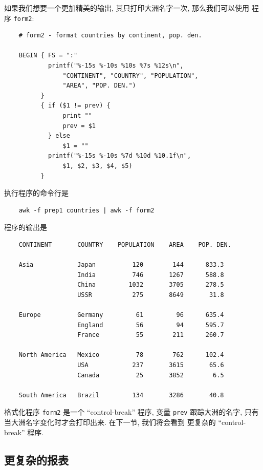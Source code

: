 如果我们想要一个更加精美的输出, 其只打印大洲名字一次, 那么我们可以使用
程序 \verb'form2':
\begin{verbatim}
    # form2 - format countries by continent, pop. den.

    BEGIN { FS = ":"
            printf("%-15s %-10s %10s %7s %12s\n",
                "CONTINENT", "COUNTRY", "POPULATION",
                "AREA", "POP. DEN.")
          }
          { if ($1 != prev) {
                print ""
                prev = $1
            } else
                $1 = ""
            printf("%-15s %-10s %7d %10d %10.1f\n",
                $1, $2, $3, $4, $5)
          }
\end{verbatim}
执行程序的命令行是 
\begin{verbatim}
    awk -f prep1 countries | awk -f form2
\end{verbatim}
程序的输出是
\begin{verbatim}
    CONTINENT       COUNTRY    POPULATION    AREA    POP. DEN.

    Asia            Japan          120        144      833.3
                    India          746       1267      588.8
                    China         1032       3705      278.5
                    USSR           275       8649       31.8

    Europe          Germany         61         96      635.4
                    England         56         94      595.7
                    France          55        211      260.7

    North America   Mexico          78        762      102.4
                    USA            237       3615       65.6
                    Canada          25       3852        6.5

    South America   Brazil         134       3286       40.8
\end{verbatim}

格式化程序 \verb'form2' 是一个 ``control-break'' 程序, 变量 \verb'prev' 
跟踪大洲的名字, 只有当大洲名字变化时才会打印出来. 在下一节, 我们将会看到 
更复杂的 ``control-break'' 程序.

\subsection{更复杂的报表}
\label{subsec:a_more_complex_report}


